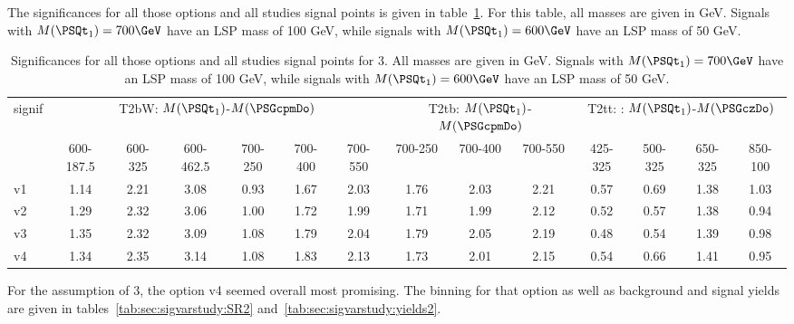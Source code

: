 The significances for all those options and all studies signal points is given in table~\ref{tab:sec:sigvarstudy:eval2}. For this table, all masses are given in GeV. Signals with $M(\PSQt_1) = 700\GeV$ have an LSP mass of 100 GeV, while signals with $M(\PSQt_1) = 600\GeV$ have an LSP mass of 50 GeV.

\begin{table}
\begin{center}
\caption{Significances for all those options and all studies signal points for 3\fbinv. All masses are given in GeV. Signals with $M(\PSQt_1) = 700\GeV$ have an LSP mass of 100 GeV, while signals with $M(\PSQt_1) = 600\GeV$ have an LSP mass of 50 GeV.\label{tab:sec:sigvarstudy:eval2}}
\tiny
\begin{tabular}{|l|cccccc|ccc|cccc|}
\hline
signif & \multicolumn{6}{c|}{T2bW: $M(\PSQt_1)$-$M(\PSGcpmDo)$} & \multicolumn{3}{c|}{T2tb: $M(\PSQt_1)$-$M(\PSGcpmDo)$} & \multicolumn{4}{c|}{T2tt: : $M(\PSQt_1)$-$M(\PSGczDo)$} \\
   & 600-187.5 & 600-325 & 600-462.5 & 700-250 & 700-400 & 700-550 & 700-250 & 700-400 & 700-550 & 425-325 & 500-325 & 650-325 & 850-100 \\
\hline
v1 & 1.14 & 2.21 & 3.08 & 0.93 & 1.67 & 2.03 & 1.76 & 2.03 & 2.21 & 0.57 & 0.69 & 1.38 & 1.03\\ 
v2 & 1.29 & 2.32 & 3.06 & 1.00 & 1.72 & 1.99 & 1.71 & 1.99 & 2.12 & 0.52 & 0.57 & 1.38 & 0.94 \\
v3 & 1.35 & 2.32 & 3.09 & 1.08 & 1.79 & 2.04 & 1.79 & 2.05 & 2.19 & 0.48 & 0.54 & 1.39 & 0.98 \\
v4 & 1.34 & 2.35 & 3.14 & 1.08 & 1.83 & 2.13 & 1.73 & 2.01 & 2.15 & 0.54 & 0.66 & 1.41 & 0.95 \\
\hline
\end{tabular}
\end{center}
\end{table}

For the assumption of 3\fbinv, the option v4 seemed overall most promising. The binning for that option as well as background and signal yields are given in tables~\ref{tab:sec:sigvarstudy:SR2} and~\ref{tab:sec:sigvarstudy:yields2}.

